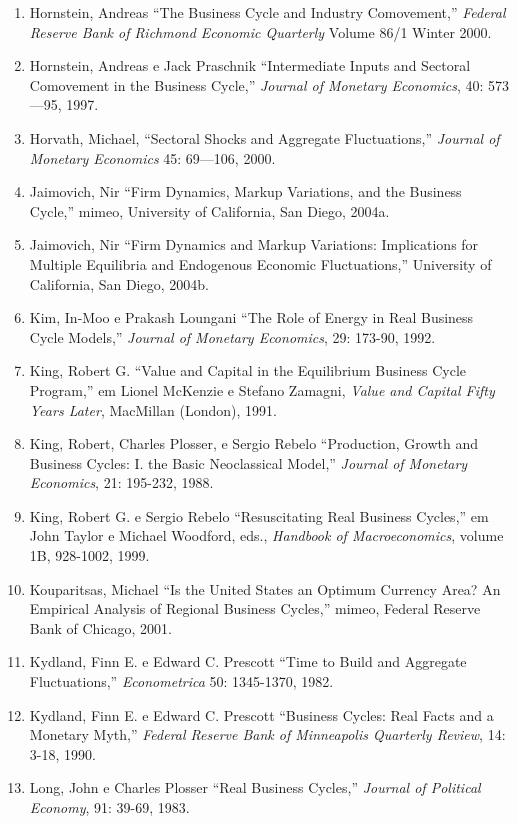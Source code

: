 \documentclass[12pt]{article}
\begin{document}
\begin{enumerate}
    \item Hornstein, Andreas “The Business Cycle and Industry Comovement,” \textit{Federal Reserve Bank of Richmond Economic Quarterly} Volume 86/1 Winter 2000.
    \item Hornstein, Andreas e Jack Praschnik “Intermediate Inputs and Sectoral Comovement in the Business Cycle,” \textit{Journal of Monetary Economics}, 40: 573—95, 1997.
    \item Horvath, Michael, “Sectoral Shocks and Aggregate Fluctuations,” \textit{Journal of Monetary Economics} 45: 69—106, 2000.
    \item Jaimovich, Nir “Firm Dynamics, Markup Variations, and the Business Cycle,” mimeo, University of California, San Diego, 2004a.
    \item Jaimovich, Nir “Firm Dynamics and Markup Variations: Implications for Multiple Equilibria and Endogenous Economic Fluctuations,” University of California, San Diego, 2004b.
    \item Kim, In-Moo e Prakash Loungani “The Role of Energy in Real Business Cycle Models,” \textit{Journal of Monetary Economics}, 29: 173-90, 1992.
    \item King, Robert G. “Value and Capital in the Equilibrium Business Cycle Program,” em Lionel McKenzie e Stefano Zamagni, \textit{Value and Capital Fifty Years Later}, MacMillan (London), 1991.
    \item King, Robert, Charles Plosser, e Sergio Rebelo “Production, Growth and Business Cycles: I. the Basic Neoclassical Model,” \textit{Journal of Monetary Economics}, 21: 195-232, 1988.
    \item King, Robert G. e Sergio Rebelo “Resuscitating Real Business Cycles,” em John Taylor e Michael Woodford, eds., \textit{Handbook of Macroeconomics}, volume 1B, 928-1002, 1999.
    \item Kouparitsas, Michael “Is the United States an Optimum Currency Area? An Empirical Analysis of Regional Business Cycles,” mimeo, Federal Reserve Bank of Chicago, 2001.
    \item Kydland, Finn E. e Edward C. Prescott “Time to Build and Aggregate Fluctuations,” \textit{Econometrica} 50: 1345-1370, 1982.
    \item Kydland, Finn E. e Edward C. Prescott “Business Cycles: Real Facts and a Monetary Myth,” \textit{Federal Reserve Bank of Minneapolis Quarterly Review}, 14: 3-18, 1990.
    \item Long, John e Charles Plosser “Real Business Cycles,” \textit{Journal of Political Economy}, 91: 39-69, 1983.

\end{enumerate}
\end{document}
